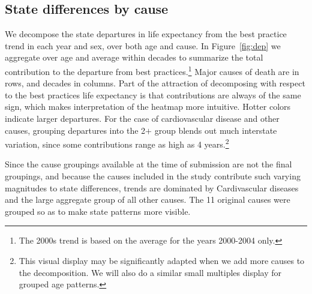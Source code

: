 \documentclass[11pt,oneside,a4paper]{article} %
\begin{document}
\subsection{State differences by cause}

We decompose the state departures in life expectancy from the best practice
trend in each year and sex, over both age and cause. In Figure~\ref{fig:dep}
we aggregate over age and average within decades to summarize the total
contribution to the departure from best practices.\footnote{The 2000s trend is
based on the average for the years 2000-2004 only.} Major causes of death are in
rows, and decades in columns.
Part of the attraction of decomposing with respect to the best practices life expectancy is that contributions are always
of the same sign, which makes interpretation of the heatmap more intuitive.
Hotter colors indicate larger departures. For the case of cardiovascular disease
and other causes, grouping departures into the 2$+$ group blends out much
interstate variation, since some contributions range as high as 4
years.\footnote{This visual display may be significantly adapted when we add
more causes to the decomposition. We will also do a similar small multiples
display for grouped age patterns.}

Since the cause groupings available at the time of submission are not the final groupings, and
because the causes included in the study contribute such varying magnitudes to
state differences, trends are dominated by Cardivascular diseases and the large
aggregate group of all other causes. The 11 original causes were grouped so as
to make state patterns more visible.
\end{document}
